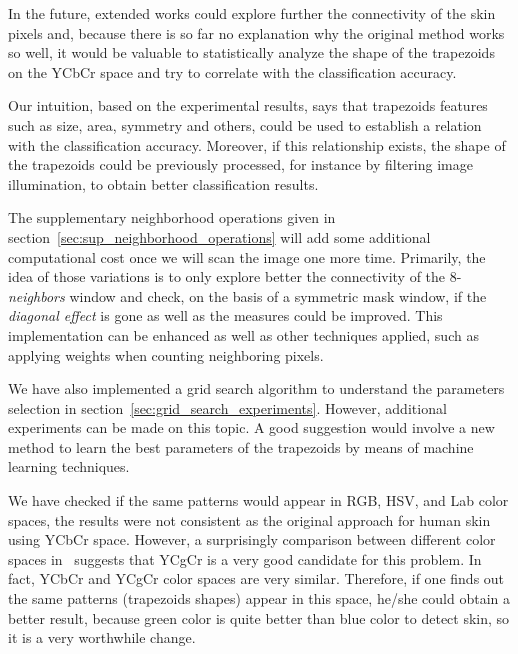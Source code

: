 In the future, extended works could explore further the connectivity of the skin pixels and, because there is so far no explanation why the original method works so well, it would be valuable to statistically analyze the shape of the trapezoids on the YCbCr space and try to correlate with the classification accuracy.

Our intuition, based on the experimental results, says that trapezoids features such as size, area, symmetry and others, could be used to establish a relation with the classification accuracy. Moreover, if  this relationship exists, the shape of the trapezoids could be previously processed, for instance by filtering image illumination, to obtain better classification results.

The supplementary neighborhood operations given in section~\ref{sec:sup_neighborhood_operations} will add some additional computational cost once we will scan the image one more time. Primarily, the idea of those variations is to only explore better the connectivity of the 8-\textit{neighbors} window and check, on the basis of a symmetric mask window, if the \textit{diagonal effect} is gone as well as the measures could be improved. This implementation can be enhanced as well as other techniques applied, such as applying weights when counting neighboring pixels.

We have also implemented a grid search algorithm to understand the parameters selection in section~\ref{sec:grid_search_experiments}. However, additional experiments can be made on this topic. A good suggestion would involve a new method to learn the best parameters of the trapezoids by means of machine learning techniques.

We have checked if the same patterns would appear in RGB, HSV, and Lab color spaces, the results were not consistent as the original approach for human skin using YCbCr space. However, a surprisingly comparison between different color spaces in~\citet{chaves:10} suggests that YCgCr is a very good candidate for this problem. In fact, YCbCr and YCgCr color spaces are very similar. Therefore, if one finds out the same patterns (trapezoids shapes) appear in this space, he/she could obtain a better result, because green color is quite better than blue color to detect skin, so it is a very worthwhile change.